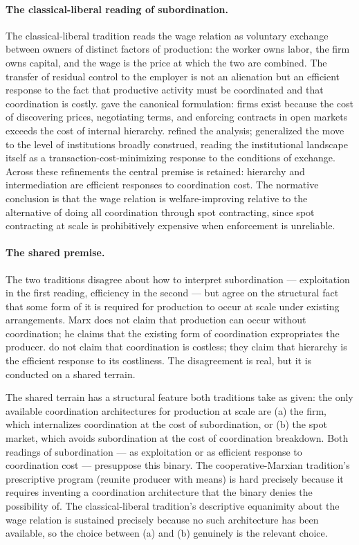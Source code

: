 \documentclass[11pt,a4paper]{article}
\theoremstyle{remark}
\begin{document}
\paragraph{The classical-liberal reading of subordination.}
The classical-liberal tradition reads the wage relation as
voluntary exchange between owners of distinct factors of
production: the worker owns labor, the firm owns capital, and the
wage is the price at which the two are combined. The transfer of
residual control to the employer is not an alienation but an
efficient response to the fact that productive activity must be
coordinated and that coordination is costly. \citet{coase1937}
gave the canonical formulation: firms exist because the cost of
discovering prices, negotiating terms, and enforcing contracts in
open markets exceeds the cost of internal hierarchy.
\citet{williamson1985,hart1995} refined the analysis;
\citet{north1990institutions} generalized the move to the level
of institutions broadly construed, reading the institutional
landscape itself as a transaction-cost-minimizing response to
the conditions of exchange. Across these refinements the central
premise is retained: hierarchy and intermediation are efficient
responses to coordination cost. The normative conclusion is that
the wage relation is welfare-improving relative to the
alternative of doing all coordination through spot contracting,
since spot contracting at scale is prohibitively expensive when
enforcement is unreliable.

\paragraph{The shared premise.}
The two traditions disagree about how to interpret subordination
--- exploitation in the first reading, efficiency in the second
--- but agree on the structural fact that some form of it is
required for production to occur at scale under existing
arrangements. Marx does not claim that production can occur
without coordination; he claims that the existing form of
coordination expropriates the producer.
\citet{coase1937,williamson1985,hart1995} do not claim that
coordination is costless; they claim that hierarchy is the
efficient response to its costliness. The disagreement is real,
but it is conducted on a shared terrain.

The shared terrain has a structural feature both traditions take
as given: the only available coordination architectures for
production at scale are (a) the firm, which internalizes
coordination at the cost of subordination, or (b) the spot market,
which avoids subordination at the cost of coordination breakdown.
Both readings of subordination --- as exploitation or as
efficient response to coordination cost --- presuppose this
binary. The cooperative-Marxian tradition's prescriptive program
(reunite producer with means) is hard precisely because it
requires inventing a coordination architecture that the binary
denies the possibility of. The classical-liberal tradition's
descriptive equanimity about the wage relation is sustained
precisely because no such architecture has been available, so the
choice between (a) and (b) genuinely is the relevant choice.
\end{document}
